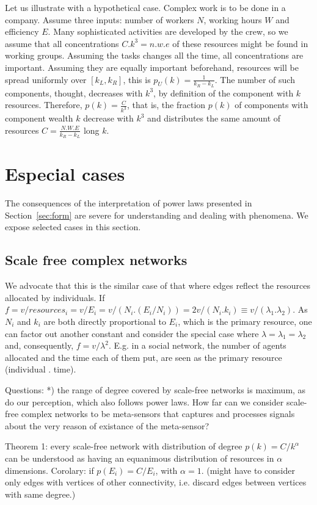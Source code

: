 \documentclass[a4paper, 11pt]{article} %
\begin{document}
Let us illustrate with a hypothetical case.
Complex work is to be done in a company.
Assume three inputs:
number of workers $N$, working hours $W$
and efficiency $E$.
Many sophisticated activities are developed by the crew,
so we assume that all concentrations $C.k^3=n.w.e$
of these resources might be found in working groups.
Assuming the tasks changes all the time,
all concentrations are important.
Assuming they are equally important beforehand,
resources will be spread uniformly over $[k_L,k_R]$,
this is $p_U(k)=\frac{1}{k_R-k_L}$.
The number of such components, thought,
decreases with $k^3$, by definition of the component
with $k$ resources.
Therefore, $p(k)=\frac{C}{k^3}$, that is,
the fraction $p(k)$ of components with component wealth $k$
decrease with $k^3$ and distributes the same
amount of resources $C=\frac{N.W.E}{k_R-k_L}$ long $k$.

\section{Especial cases}
The consequences of the
interpretation of power laws presented in Section~\ref{sec:form}
are severe for understanding and dealing with
phenomena. We expose selected cases in this section.


\subsection{Scale free complex networks}
We advocate that this is the similar case of that where edges reflect the resources allocated by individuals. If $f=v/resources_i=v/E_i=v/(N_i . (E_i/N_i))=2v/(N_i . k_i) \equiv v / (\lambda_1 .   \lambda_2)$. As $N_i$ and $k_i$ are both directly proportional to $E_i$, which is the primary resource, one can factor out another constant and consider the special case where $\lambda=\lambda_1=\lambda_2$ and, consequently, $f=v/\lambda^2$. E.g. in a social network, the number of agents allocated and the time each of them put, are seen as the primary resource (individual . time).

Questions:
*) the range of degree covered by scale-free networks is maximum, as do our perception, which also follows power laws. How far can we consider scale-free complex networks to be meta-sensors that captures and processes signals about the very reason of existance of the meta-sensor?

Theorem 1: every scale-free network with distribution of degree $p(k)=C/k^\alpha$ can be understood as having an equanimous distribution of resources in $\alpha$ dimensions.
Corolary: if $p(E_i)=C/E_i$, with $\alpha=1$. (might have to consider only edges with vertices of other connectivity, i.e. discard edges between vertices with same degree.)
\end{document}

